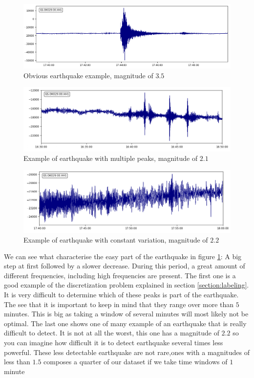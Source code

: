 \documentclass[10pt,conference,compsocconf]{IEEEtran}
\begin{document}
\begin{figure}[h]
  \centering
	\includegraphics[width=\columnwidth]{fat-earthquake-example.png}
  \caption{Obvious earthquake example, magnitude of $3.5$}
	\label{fig:obvious}
\end{figure}

\begin{figure}[h]
  \centering
	\includegraphics[width=\columnwidth]{multiple-peaks-example.png}
  \caption{Example of earthquake with multiple peaks, magnitude of $2.1$}
	\label{fig:multiplepeaks}
\end{figure}
\begin{figure}[h]
  \centering
	\includegraphics[width=\columnwidth]{constant-variation-example.png}
  \caption{Example of earthquake with constant variation, magnitude of $2.2$}
	\label{fig:constanteq}
\end{figure}

We can see what characterise the easy part of the earthquake in figure \ref{fig:obvious}: A big step at first followed by a slower decrease. During this period, a great amount of different frequencies, including high frequencies are present. The first one is a good example of the discretization problem explained in section \ref{section:labeling}. It is very difficult to determine which of these peaks is part of the earthquake. The see that it is important to keep in mind that they range over more than $5$ minutes. This is big as taking a window of several minutes will most likely not be optimal. The last one shows one of many example of an earthquake that is really difficult to detect. It is not at all the worst, this one has a magnitude of $2.2$ so you can imagine how difficult it is to detect earthquake several times less powerful. These less detectable earthquake are not rare,ones with a magnitudes of less than $1.5$ composes a quarter of our dataset if we take time windows of $1$ minute
\end{document}
